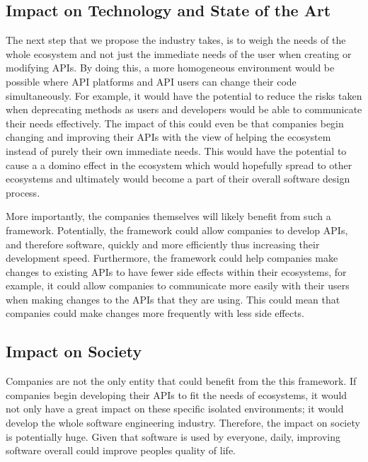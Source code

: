 \documentclass{article}
\begin{document}
\subsection{Impact on Technology and State of the Art}
The next step that we propose the industry takes, is to weigh the needs of the whole ecosystem and not just the immediate needs of the user when creating or modifying APIs. By doing this, a more homogeneous environment would be possible where API platforms and API users can change their code simultaneously. For example, it would have the potential to reduce the risks taken when deprecating methods as users and developers would be able to communicate their needs effectively. The impact of this could even be that companies begin changing and improving their APIs with the view of helping the ecosystem instead of purely their own immediate needs. This would have the potential to cause a a domino effect in the ecosystem which would hopefully spread to other ecosystems and ultimately would become a part of their overall software design process. 

More importantly, the companies themselves will likely benefit from such a framework. Potentially, the framework could allow companies to develop APIs, and therefore software, quickly and more efficiently thus increasing their development speed. Furthermore, the framework could help companies make changes to existing APIs to have fewer side effects within their ecosystems, for example, it could allow companies to communicate more easily with their users when making changes to the APIs that they are using. This could mean that companies could make changes more frequently with less side effects.

\subsection{Impact on Society}
Companies are not the only entity that could benefit from the this framework. If companies begin developing their APIs to fit the needs of ecosystems, it would not only have a great impact on these specific isolated environments; it would develop the whole software engineering industry. Therefore, the impact on society is potentially huge. Given that software is used by everyone, daily, improving software overall could improve peoples quality of life.
\end{document}
